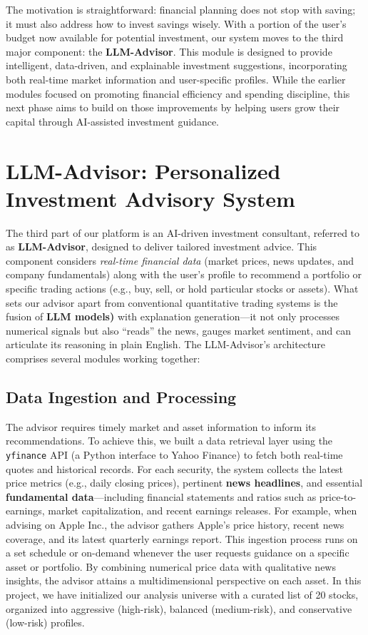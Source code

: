 \documentclass[conference]{IEEEtran}
\begin{document}
The motivation is straightforward: financial planning does not stop with saving; it must also address how to invest savings wisely. With a portion of the user's budget now available for potential investment, our system moves to the third major component: the \textbf{LLM-Advisor}. This module is designed to provide intelligent, data-driven, and explainable investment suggestions, incorporating both real-time market information and user-specific profiles. While the earlier modules focused on promoting financial efficiency and spending discipline, this next phase aims to build on those improvements by helping users grow their capital through AI-assisted investment guidance.


\section{LLM-Advisor: Personalized Investment Advisory System}

The third part of our platform is an AI-driven investment consultant, referred to as \textbf{LLM-Advisor}, designed to deliver tailored investment advice. This component considers \textit{real-time financial data} (market prices, news updates, and company fundamentals) along with the {user’s profile} to recommend a portfolio or specific trading actions (e.g., buy, sell, or hold particular stocks or assets). What sets our advisor apart from conventional quantitative trading systems is the fusion of \textbf{LLM models)} with explanation generation—it not only processes numerical signals but also ``reads'' the news, gauges market sentiment, and can articulate its reasoning in plain English. The LLM-Advisor’s architecture comprises several modules working together:

\subsection{Data Ingestion and Processing}

The advisor requires timely market and asset information to inform its recommendations. To achieve this, we built a data retrieval layer using the \texttt{yfinance} API (a Python interface to Yahoo Finance) to fetch both real-time quotes and historical records. For each security, the system collects the latest price metrics (e.g., daily closing prices), pertinent \textbf{news headlines}, and essential \textbf{fundamental data}—including financial statements and ratios such as price-to-earnings, market capitalization, and recent earnings releases. For example, when advising on Apple Inc., the advisor gathers Apple’s price history, recent news coverage, and its latest quarterly earnings report. This ingestion process runs on a set schedule or on-demand whenever the user requests guidance on a specific asset or portfolio. By combining numerical price data with qualitative news insights, the advisor attains a multidimensional perspective on each asset. In this project, we have initialized our analysis universe with a curated list of 20 stocks, organized into aggressive (high-risk), balanced (medium-risk), and conservative (low-risk) profiles.
\end{document}
